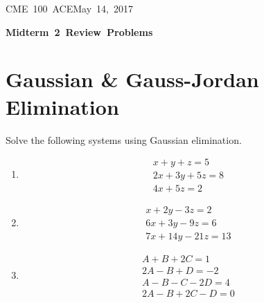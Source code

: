 \documentclass[letterpaper, 11pt]{article}
\makeatletter
\newcommand{\hmwkTitle}{Midterm\ 2\ Review\ Problems} %
\newcommand{\hmwkClass}{CME\ 100\ ACE} %
\newcommand{\hmwkAuthorName}{T Anderson, S Messingher, A Kusimo} %
\newcommand{\hmwkAuthorEmail}{timmya@stanford.edu} %
\makeatother
\begin{document}
\noindent
\normalsize 
\hmwkClass \hfill May\ 14,\ 2017\\

\begin{center} \Large \textbf{\hmwkTitle} \end{center}

\section{Gaussian \& Gauss-Jordan Elimination}
Solve the following systems using Gaussian elimination. 
\begin{enumerate}
\item
\begin{gather*}
x + y + z = 5\\
2x + 3y + 5z = 8 \\
4x + 5z = 2 
\end{gather*}

\item
\begin{gather*}
x + 2y - 3z = 2\\
6x + 3y - 9 z = 6 \\
7x  + 14y - 21z = 13 
\end{gather*}

\item
\begin{gather*}
A + B + 2C = 1\\
2A - B + D = -2\\
A - B - C - 2D = 4\\
2A - B + 2C - D = 0 
\end{gather*}

\end{enumerate}
\end{document}
